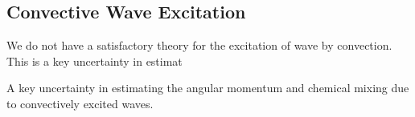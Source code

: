 {\color{purple}
\subsection{Convective Wave Excitation}
}

We do not have a satisfactory theory for the excitation of wave by convection. This is a key uncertainty in estimat

A key uncertainty in estimating the angular momentum and chemical mixing due to convectively excited waves.
